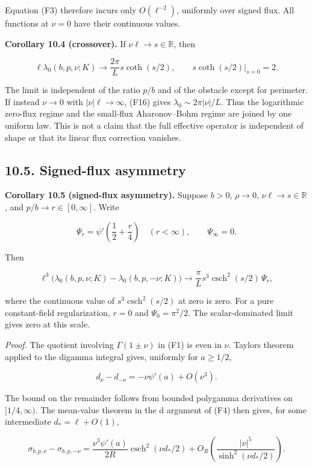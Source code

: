 \documentclass[11pt]{article}
\begin{document}
Equation (F3) therefore incurs only \(O(\ell^{-2})\), uniformly over
signed flux. All functions at \(\nu=0\) have their continuous values.

\textbf{Corollary 10.4 (crossover).} If \(\nu\ell\to s\in\mathbb R\),
then

\[\ell\lambda_0(b,p,\nu;K)\longrightarrow
\frac{2\pi}{L}s\coth(s/2),\qquad s\coth(s/2)|_{s=0}=2.\tag{F17}\]

The limit is independent of the ratio \(p/b\) and of the obstacle except
for perimeter. If instead \(\nu\to0\) with \(|\nu|\ell\to\infty\), (F16)
gives \(\lambda_0\sim2\pi|\nu|/L\). Thus the logarithmic zero-flux
regime and the small-flux Aharonov--Bohm regime are joined by one
uniform law. This is not a claim that the full effective operator is
independent of shape or that its linear flux correction vanishes.

\subsection{10.5. Signed-flux asymmetry}\label{signed-flux-asymmetry}

\textbf{Corollary 10.5 (signed-flux asymmetry).} Suppose \(b>0\),
\(\rho\to0\), \(\nu\ell\to s\in\mathbb R\), and
\(p/b\to r\in[0,\infty]\). Write

\[\Psi_r=\psi'\left(\frac12+\frac r4\right)\quad(r<\infty),\qquad\Psi_\infty=0.\]

Then

\[\ell^3\bigl(\lambda_0(b,p,\nu;K)-\lambda_0(b,p,-\nu;K)\bigr)
\longrightarrow \frac{\pi}{L}s^3\operatorname{csch}^2(s/2)\,\Psi_r,\tag{F18}\]

where the continuous value of \(s^3\operatorname{csch}^2(s/2)\) at zero
is zero. For a pure constant-field regularization, \(r=0\) and
\(\Psi_0=\pi^2/2\). The scalar-dominated limit gives zero at this scale.

\emph{Proof.} The quotient involving \(\Gamma(1\pm\nu)\) in (F1) is even
in \(\nu\). Taylor\textquotesingle s theorem applied to the digamma
integral gives, uniformly for \(a\geq1/2\),

\[d_\nu-d_{-\nu}=-\nu\psi'(a)+O(\nu^3).\]

The bound on the remainder follows from bounded polygamma derivatives on
\([1/4,\infty)\). The mean-value theorem in the d argument of (F4) then
gives, for some intermediate \(d_*=\ell+O(1)\),

\[\sigma_{b,p,\nu}-\sigma_{b,p,-\nu}
=\frac{\nu^3\psi'(a)}{2R}\operatorname{csch}^2(\nu d_*/2)
+O_R\left(\frac{|\nu|^5}{\sinh^2(\nu d_*/2)}\right).\tag{F19}\]
\end{document}
